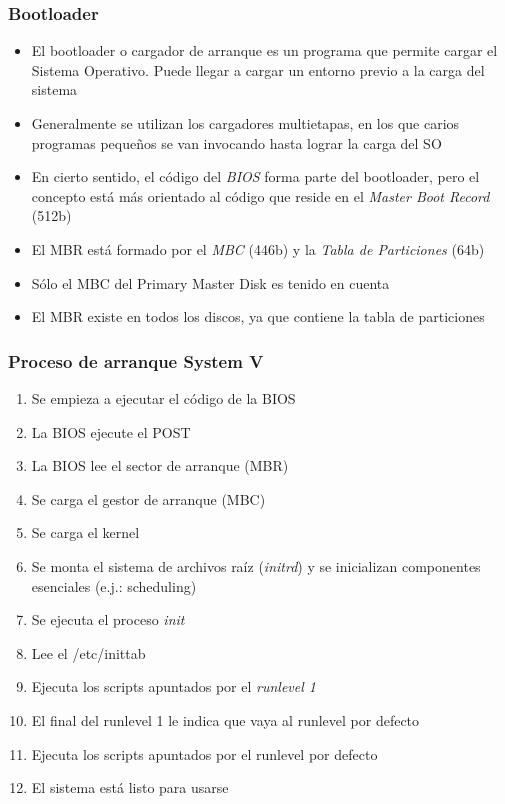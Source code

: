 \begin{frame}
  \frametitle{Bootloader}
  \begin{itemize}
  	\item El bootloader o cargador de arranque es un programa que permite cargar el Sistema Operativo. Puede llegar a cargar un entorno previo a la carga del sistema

  	\item Generalmente se utilizan los cargadores multietapas, en los que carios programas pequeños se van invocando hasta lograr la carga del SO

  	\item En cierto sentido, el código del \textit{BIOS} forma parte del bootloader, pero el concepto está más orientado al código que reside en el \textit{Master Boot Record} (512b)

  	\item El MBR está formado por el \textit{MBC} (446b) y la \textit{Tabla de Particiones} (64b)

  	\item Sólo el MBC del Primary Master Disk es tenido en cuenta

  	\item El MBR existe en todos los discos, ya que contiene la tabla de particiones
  \end{itemize}
\end{frame}

\begin{frame}
  \frametitle{Proceso de arranque \textbf{System V}}
  \begin{enumerate}
	\item Se empieza a ejecutar el código de la BIOS
	\item La BIOS ejecute el POST
	\item La BIOS lee el sector de arranque (MBR)
	\item Se carga el gestor de arranque (MBC)
	\item Se carga el kernel
	\item Se monta el sistema de archivos raíz (\textit{initrd}) y se inicializan componentes esenciales (e.j.: scheduling)
	\item Se ejecuta el proceso \textit{init}
	\item Lee el /etc/inittab
	\item Ejecuta los scripts apuntados por el \textit{runlevel 1}
	\item El final del runlevel 1 le indica que vaya al runlevel por defecto
	\item Ejecuta los scripts apuntados por el runlevel por defecto
	\item El sistema está listo para usarse
  \end{enumerate}
\end{frame}

